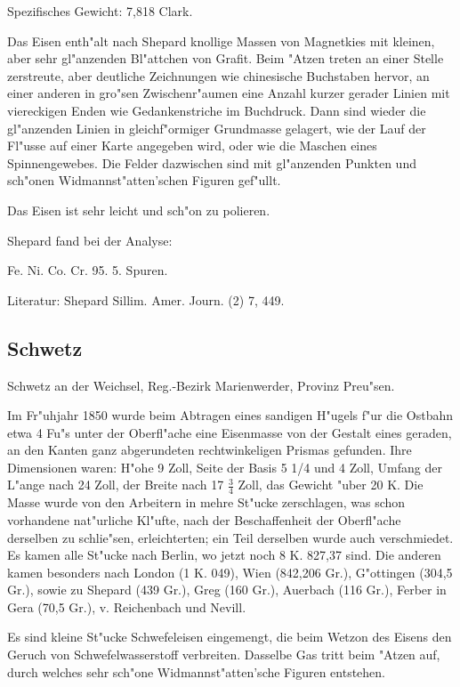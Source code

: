 \documentclass[a4paper, 11pt, oneside]{article}
\begin{document}
Spezifisches Gewicht: 7,818 Clark.

Das Eisen enth"alt nach Shepard knollige Massen von Magnetkies mit kleinen, aber sehr gl"anzenden Bl"attchen von Grafit. Beim "Atzen treten an einer Stelle zerstreute, aber deutliche Zeichnungen wie chinesische Buchstaben hervor, an einer anderen in gro"sen Zwischenr"aumen eine Anzahl kurzer gerader Linien mit viereckigen Enden wie Gedankenstriche im Buchdruck. Dann sind wieder die gl"anzenden Linien in gleichf"ormiger Grundmasse gelagert, wie der Lauf der Fl"usse auf einer Karte angegeben wird, oder wie die Maschen eines Spinnengewebes. Die Felder dazwischen sind mit gl"anzenden Punkten und sch"onen Widmannst"atten'schen Figuren gef"ullt.

Das Eisen ist sehr leicht und sch"on zu polieren.

Shepard fand bei der Analyse:

Fe. Ni. Co. Cr.  
95. 5. Spuren.

Literatur: Shepard Sillim. Amer. Journ. (2) 7, 449.

\subsection{Schwetz}

Schwetz an der Weichsel, Reg.-Bezirk Marienwerder, Provinz Preu"sen.

Im Fr"uhjahr 1850 wurde beim Abtragen eines sandigen H"ugels f"ur die Ostbahn etwa 4 Fu"s unter der Oberfl"ache eine Eisenmasse von der Gestalt eines geraden, an den Kanten ganz abgerundeten rechtwinkeligen Prismas gefunden. Ihre Dimensionen waren: H"ohe 9 Zoll, Seite der Basis 5 1/4 und 4 Zoll, Umfang der L"ange nach 24 Zoll, der Breite nach 17 $\frac{3}{4}$ Zoll, das Gewicht "uber 20 K. Die Masse wurde von den Arbeitern in mehre St"ucke zerschlagen, was schon vorhandene nat"urliche Kl"ufte, nach der Beschaffenheit der Oberfl"ache derselben zu schlie"sen, erleichterten; ein Teil derselben wurde auch verschmiedet. Es kamen alle St"ucke nach Berlin, wo jetzt noch 8 K. 827,37 sind. Die anderen kamen besonders nach London (1 K. 049), Wien (842,206 Gr.), G"ottingen (304,5 Gr.), sowie zu Shepard (439 Gr.), Greg (160 Gr.), Auerbach (116 Gr.), Ferber in Gera (70,5 Gr.), v. Reichenbach und Nevill.

Es sind kleine St"ucke Schwefeleisen eingemengt, die beim Wetzon des Eisens den Geruch von Schwefelwasserstoff verbreiten. Dasselbe Gas tritt beim "Atzen auf, durch welches sehr sch"one Widmannst"atten'sche Figuren entstehen.
\end{document}
